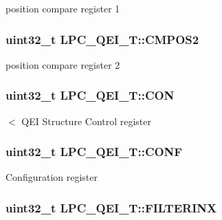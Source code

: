 position compare register 1 \hypertarget{structLPC__QEI__T_aa2f3bddd189d57b8985ffca9ddb70ff2}{
\subsubsection[{C\-M\-P\-O\-S2}]{ uint32\-\_\-t L\-P\-C\-\_\-\-Q\-E\-I\-\_\-\-T\-::\-C\-M\-P\-O\-S2}}\label{structLPC__QEI__T_aa2f3bddd189d57b8985ffca9ddb70ff2}
position compare register 2 \hypertarget{structLPC__QEI__T_af84cacebc1e4ba309cb8c1af4acca96f}{
\subsubsection[{C\-O\-N}]{ uint32\-\_\-t L\-P\-C\-\_\-\-Q\-E\-I\-\_\-\-T\-::\-C\-O\-N}}\label{structLPC__QEI__T_af84cacebc1e4ba309cb8c1af4acca96f}
$<$ Q\-E\-I Structure Control register \hypertarget{structLPC__QEI__T_a72886edbac2779ab5e2823fd0db339f7}{
\subsubsection[{C\-O\-N\-F}]{ uint32\-\_\-t L\-P\-C\-\_\-\-Q\-E\-I\-\_\-\-T\-::\-C\-O\-N\-F}}\label{structLPC__QEI__T_a72886edbac2779ab5e2823fd0db339f7}
Configuration register \hypertarget{structLPC__QEI__T_a92cbc5ae36dcd7194b4b1f3d448ca2e5}{
\subsubsection[{F\-I\-L\-T\-E\-R\-I\-N\-X}]{ uint32\-\_\-t L\-P\-C\-\_\-\-Q\-E\-I\-\_\-\-T\-::\-F\-I\-L\-T\-E\-R\-I\-N\-X}}\label{structLPC__QEI__T_a92cbc5ae36dcd7194b4b1f3d448ca2e5}
